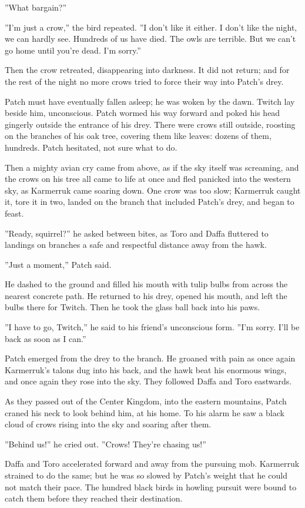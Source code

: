 \documentclass[12pt]{book}
\begin{document}
''What bargain?''

''I'm just a crow,'' the bird repeated. ''I don't like it either. I don't like the night, we can hardly see. Hundreds of us have died. The owls are terrible. But we can't go home until you're dead. I'm sorry.''

Then the crow retreated, disappearing into darkness. It did not return; and for the rest of the night no more crows tried to force their way into Patch's drey.

Patch must have eventually fallen asleep; he was woken by the dawn. Twitch lay beside him, unconscious. Patch wormed his way forward and poked his head gingerly outside the entrance of his drey. There were crows still outside, roosting on the branches of his oak tree, covering them like leaves: dozens of them, hundreds. Patch hesitated, not sure what to do.

Then a mighty avian cry came from above, as if the sky itself was screaming, and the crows on his tree all came to life at once and fled panicked into the western sky, as Karmerruk came soaring down. One crow was too slow; Karmerruk caught it, tore it in two, landed on the branch that included Patch's drey, and began to feast.

''Ready, squirrel?'' he asked between bites, as Toro and Daffa fluttered to landings on branches a safe and respectful distance away from the hawk.

''Just a moment,'' Patch said.

He dashed to the ground and filled his mouth with tulip bulbs from across the nearest concrete path. He returned to his drey, opened his mouth, and left the bulbs there for Twitch. Then he took the glass ball back into his paws.

''I have to go, Twitch,'' he said to his friend's unconscious form. ''I'm sorry. I'll be back as soon as I can.''

Patch emerged from the drey to the branch. He groaned with pain as once again Karmerruk's talons dug into his back, and the hawk beat his enormous wings, and once again they rose into the sky. They followed Daffa and Toro eastwards.

As they passed out of the Center Kingdom, into the eastern mountains, Patch craned his neck to look behind him, at his home. To his alarm he saw a black cloud of crows rising into the sky and soaring after them.

''Behind us!'' he cried out. ''Crows! They're chasing us!''

Daffa and Toro accelerated forward and away from the pursuing mob. Karmerruk strained to do the same; but he was so slowed by Patch's weight that he could not match their pace. The hundred black birds in howling pursuit were bound to catch them before they reached their destination.
\end{document}
